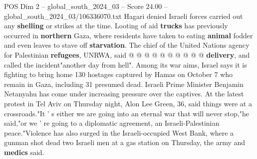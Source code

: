 \begin{textsample}{POS Dim 2 – global\_south\_2024\_03 – Score 24.00 – global\_south\_2024\_03/106336070.txt}
Hagari denied Israeli forces carried out any \textbf{shelling} or strikes at the time.
Looting of aid \textbf{trucks} has previously occurred in \textbf{northern} Gaza, where residents have taken to eating \textbf{animal} fodder and even leaves to stave off \textbf{starvation}.
The chief of the United Nations agency for Palestinian \textbf{refugees}, UNRWA, said @ @ @ @ @ @ @ @ @ @ \textbf{delivery}, and called the incident"another day from hell".
Among its war aims, Israel says it is fighting to bring home 130 hostages captured by Hamas on October 7 who remain in Gaza, including 31 presumed dead.
Israeli Prime Minister Benjamin Netanyahu has come under increasing pressure over the captives.
At the latest protest in Tel Aviv on Thursday night, Alon Lee Green, 36, said things were at a crossroads."It ' s either we are going into an eternal war that will never stop,"he said,"or we ' re going to a diplomatic agreement, an Israeli-Palestinian peace."Violence has also surged in the Israeli-occupied West Bank, where a gunman shot dead two Israeli men at a gas station on Thursday, the army and \textbf{medics} said.

\end{textsample}
